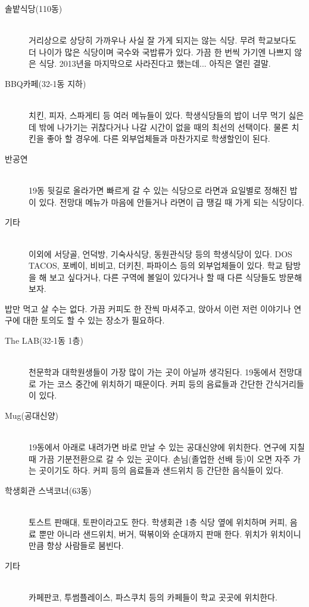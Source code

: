 \begin{description}
\item[\textsf{솔밭식당(110동)}] \hfill \\
  거리상으로 상당히 가까우나 사실 잘 가게 되지는 않는 식당. 무려 학교보다도 더
  나이가 많은 식당이며 국수와 국밥류가 있다. 가끔 한 번씩 가기엔 나쁘지 않은
  식당.  2013년을 마지막으로 사라진다고 했는데... 아직은 열린 결말.

\item[\textsf{BBQ카페(32-1동 지하)}] \hfill \\
  치킨, 피자, 스파게티 등 여러 메뉴들이 있다. 학생식당들의 밥이 너무 먹기 싫은데
  밖에 나가기는 귀찮다거나 나갈 시간이 없을 때의 최선의 선택이다. 물론 치킨을
  좋아 할 경우에. 다른 외부업체들과 마찬가지로 학생할인이 된다.

\item[\textsf{반공연}] \hfill \\
  19동 뒷길로 올라가면 빠르게 갈 수 있는 식당으로 라면과 요일별로 정해진 밥이
  있다. 전망대 메뉴가 마음에 안들거나 라면이 급 땡길 때 가게 되는 식당이다.

\item[\textsf{기타}] \hfill \\
  이외에 서당골, 언덕방, 기숙사식당, 동원관식당 등의 학생식당이 있다. DOS TACOS,
  포베이, 비비고, 더키친, 파파이스 등의 외부업체들이 있다. 학교 탐방을 해 보고
  싶다거나, 다른 구역에 볼일이 있다거나 할 때 다른 식당들도 방문해보자.

\end{description}
\starbreak 밥만 먹고 살 수는 없다. 가끔 커피도 한 잔씩 마셔주고, 앉아서 이런 저런
이야기나 연구에 대한 토의도 할 수 있는 장소가 필요하다.
\begin{description}
\item[\textsf{The LAB(32-1동 1층)}] \hfill \\
  천문학과 대학원생들이 가장 많이 가는 곳이 아닐까 생각된다. 19동에서 전망대로
  가는 코스 중간에 위치하기 때문이다. 커피 등의 음료들과 간단한 간식거리들이
  있다.

\item[\textsf{Mug(공대신양)}] \hfill \\
  19동에서 아래로 내려가면 바로 만날 수 있는 공대신양에 위치한다. 연구에 지칠 때
  가끔 기분전환으로 갈 수 있는 곳이다. 손님(졸업한 선배 등)이 오면 자주 가는
  곳이기도 하다. 커피 등의 음료들과 샌드위치 등 간단한 음식들이 있다.

\item[\textsf{학생회관 스낵코너(63동)}] \hfill \\
  토스트 판매대, 토판이라고도 한다. 학생회관 1층 식당 옆에 위치하며 커피, 음료
  뿐만 아니라 샌드위치, 버거, 떡볶이와 순대까지 판매 한다. 위치가 위치이니 만큼
  항상 사람들로 붐빈다.

\item[\textsf{기타}] \hfill \\
  카페판코, 투썸플레이스, 파스쿠치 등의 카페들이 학교 곳곳에 위치한다.
\end{description}
